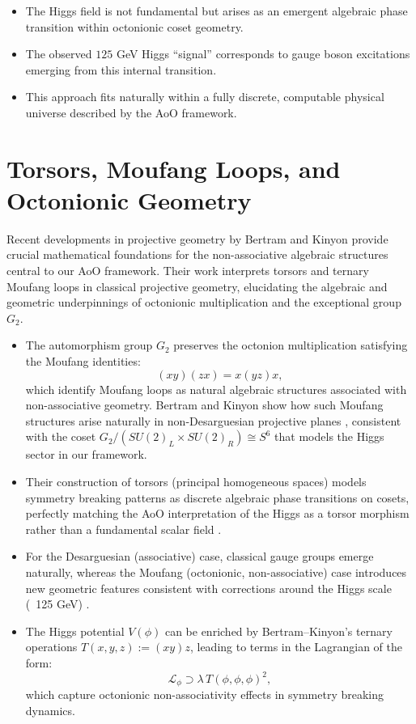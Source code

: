 \documentclass[12pt]{article}
\theoremstyle{remark}
\begin{document}
\begin{itemize}
    \item The Higgs field is not fundamental but arises as an emergent algebraic phase transition within octonionic coset geometry.
    \item The observed $125$ GeV Higgs “signal” corresponds to gauge boson excitations emerging from this internal transition.
    \item This approach fits naturally within a fully discrete, computable physical universe described by the AoO framework.
\end{itemize}

\section{Torsors, Moufang Loops, and Octonionic Geometry}

Recent developments in projective geometry by Bertram and Kinyon \cite{BertramKinyon2012} provide crucial mathematical foundations for the non-associative algebraic structures central to our AoO framework. Their work interprets torsors and ternary Moufang loops in classical projective geometry, elucidating the algebraic and geometric underpinnings of octonionic multiplication and the exceptional group $G_2$.

\begin{itemize}
\item The automorphism group $G_2$ preserves the octonion multiplication satisfying the Moufang identities:
\[
(xy)(zx) = x(yz)x,
\]
which identify Moufang loops as natural algebraic structures associated with non-associative geometry. Bertram and Kinyon show how such Moufang structures arise naturally in non-Desarguesian projective planes \cite[Theorem 5.4]{BertramKinyon2012}, consistent with the coset $G_2 / (SU(2)_L \times SU(2)_R) \cong S^6$ that models the Higgs sector in our framework.

\item Their construction of torsors (principal homogeneous spaces) models symmetry breaking patterns as discrete algebraic phase transitions on cosets, perfectly matching the AoO interpretation of the Higgs as a torsor morphism rather than a fundamental scalar field \cite[Section 3]{BertramKinyon2012}.

\item For the Desarguesian (associative) case, classical gauge groups emerge naturally, whereas the Moufang (octonionic, non-associative) case introduces new geometric features consistent with corrections around the Higgs scale (~125 GeV) \cite[Section 4]{BertramKinyon2012}.

\item The Higgs potential $V(\phi)$ can be enriched by Bertram–Kinyon's ternary operations \( T(x,y,z) := (xy)z \), leading to terms in the Lagrangian of the form:
\[
\mathcal{L}_\phi \supset \lambda \, T(\phi,\phi,\phi)^2,
\]
which capture octonionic non-associativity effects in symmetry breaking dynamics.
\end{itemize}
\end{document}
